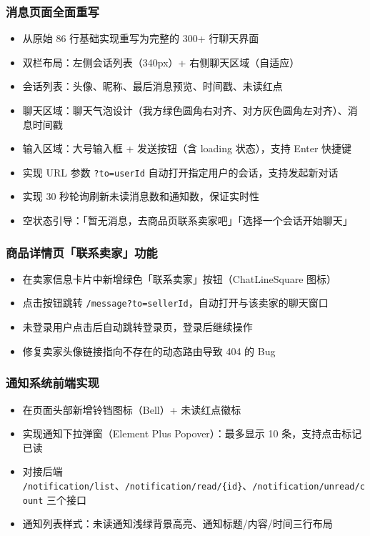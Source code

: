 \documentclass[12pt,a4paper]{ctexart}
\begin{document}
\subsubsection*{消息页面全面重写}
\begin{itemize}
    \item 从原始 86 行基础实现重写为完整的 300+ 行聊天界面
    \item 双栏布局：左侧会话列表（340px）+ 右侧聊天区域（自适应）
    \item 会话列表：头像、昵称、最后消息预览、时间戳、未读红点
    \item 聊天区域：聊天气泡设计（我方绿色圆角右对齐、对方灰色圆角左对齐）、消息时间戳
    \item 输入区域：大号输入框 + 发送按钮（含 loading 状态），支持 Enter 快捷键
    \item 实现 URL 参数 \texttt{?to=userId} 自动打开指定用户的会话，支持发起新对话
    \item 实现 30 秒轮询刷新未读消息数和通知数，保证实时性
    \item 空状态引导：「暂无消息，去商品页联系卖家吧」「选择一个会话开始聊天」
\end{itemize}

\subsubsection*{商品详情页「联系卖家」功能}
\begin{itemize}
    \item 在卖家信息卡片中新增绿色「联系卖家」按钮（ChatLineSquare 图标）
    \item 点击按钮跳转 \texttt{/message?to=sellerId}，自动打开与该卖家的聊天窗口
    \item 未登录用户点击后自动跳转登录页，登录后继续操作
    \item 修复卖家头像链接指向不存在的动态路由导致 404 的 Bug
\end{itemize}

\subsubsection*{通知系统前端实现}
\begin{itemize}
    \item 在页面头部新增铃铛图标（Bell）+ 未读红点徽标
    \item 实现通知下拉弹窗（Element Plus Popover）：最多显示 10 条，支持点击标记已读
    \item 对接后端 \texttt{/notification/list}、\texttt{/notification/read/\{id\}}、\texttt{/notification/unread/count} 三个接口
    \item 通知列表样式：未读通知浅绿背景高亮、通知标题/内容/时间三行布局
\end{itemize}
\end{document}
